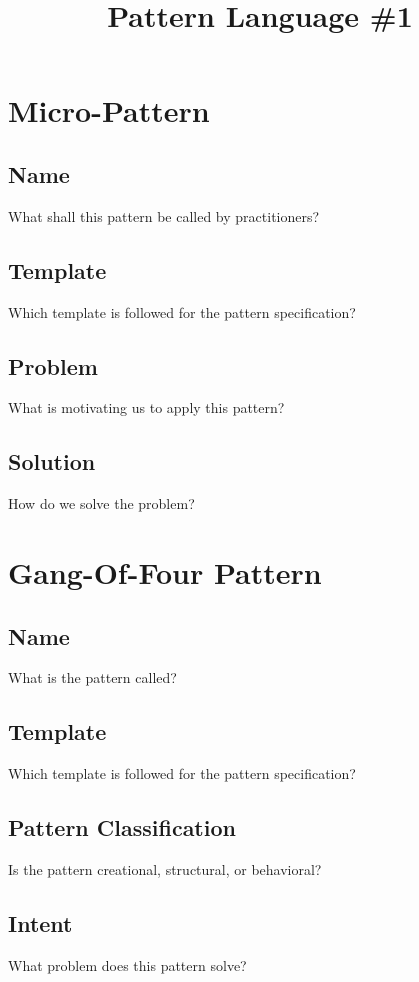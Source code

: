 \documentclass{article}
\title{Pattern Language \#1}
\begin{document}
\maketitle


\section{Micro-Pattern}

\subsection{Name}
What shall this pattern be called by practitioners?

\subsection{Template}
Which template is followed for the pattern specification?

\subsection{Problem}
What is motivating us to apply this pattern?

\subsection{Solution}
How do we solve the problem?


\section{Gang-Of-Four Pattern}

\subsection{Name}
What is the pattern called?

\subsection{Template}
Which template is followed for the pattern specification?

\subsection{Pattern Classification}
Is the pattern creational, structural, or behavioral?

\subsection{Intent}
What problem does this pattern solve?
\end{document}
